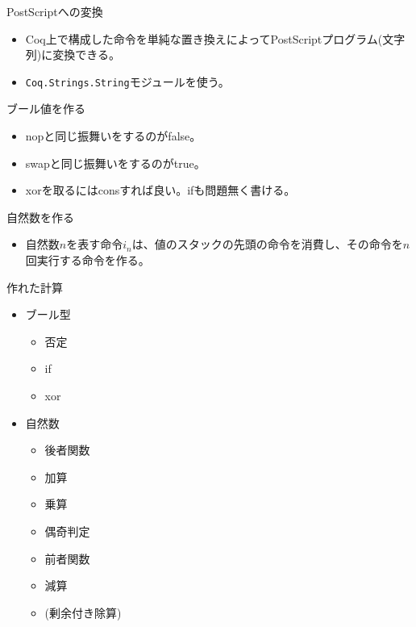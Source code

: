 \documentclass[cjk, 12pt, dvipdfm]{beamer}
\begin{document}
\begin{frame}{PostScriptへの変換}

  \begin{itemize}
   \item Coq上で構成した命令を単純な置き換えによってPostScriptプログラム(文字列)に変換できる。
   \item \texttt{Coq.Strings.String}モジュールを使う。
  \end{itemize}

\end{frame}

\begin{frame}{ブール値を作る}

 \begin{itemize}
  \item nopと同じ振舞いをするのがfalse。
  \item swapと同じ振舞いをするのがtrue。
  \item xorを取るにはconsすれば良い。ifも問題無く書ける。
 \end{itemize}

\end{frame}

\begin{frame}{自然数を作る}

 \begin{itemize}
  \item 自然数$n$を表す命令$i_n$は、値のスタックの先頭の命令を消費し、その命令を$n$回実行する命令を作る。
 \end{itemize}

\end{frame}

\begin{frame}{作れた計算}

 \begin{itemize}
  \item ブール型
	\begin{itemize}
	 \item 否定
	 \item if
	 \item xor
	\end{itemize}
  \item 自然数
	\begin{itemize}
	 \item 後者関数
	 \item 加算
	 \item 乗算
	 \item 偶奇判定
	 \item 前者関数
	 \item 減算
	 \item (剰余付き除算)
	\end{itemize}
 \end{itemize}

\end{frame}
\end{document}
